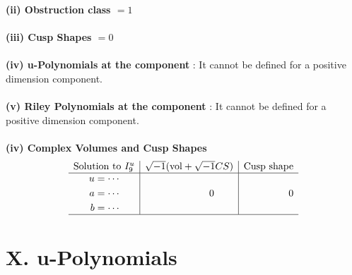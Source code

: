 \documentclass[1p]{elsarticle_modified}
\theoremstyle{definition}
\newcommand{\I}{\sqrt{-1}}
\begin{document}
\flushleft \textbf{(ii) Obstruction class $= 1$}\\~\\
\flushleft \textbf{(iii) Cusp Shapes $= 0$}\\~\\
\flushleft \textbf{(iv) u-Polynomials at the component} : It cannot be defined for a positive dimension component.\\~\\
\flushleft \textbf{(v) Riley Polynomials at the component} : It cannot be defined for a positive dimension component.\\~\\
\newpage\flushleft \textbf{(iv) Complex Volumes and Cusp Shapes}
$$\begin{array}{c|c|c} 
\text{Solution to }I^u_{9}& \I (\text{vol} + \sqrt{-1}CS) & \text{Cusp shape}\\
 \hline 
\begin{aligned}
u &= \cdots \\
a &= \cdots \\
b &= \cdots\end{aligned}
 & \phantom{-0.000000 } 0 & \phantom{-0.000000 } 0\\
 \hline 
 \end{array}
$$
\newpage\renewcommand{\arraystretch}{1}
\centering \section*{ X. u-Polynomials}
\end{document}
